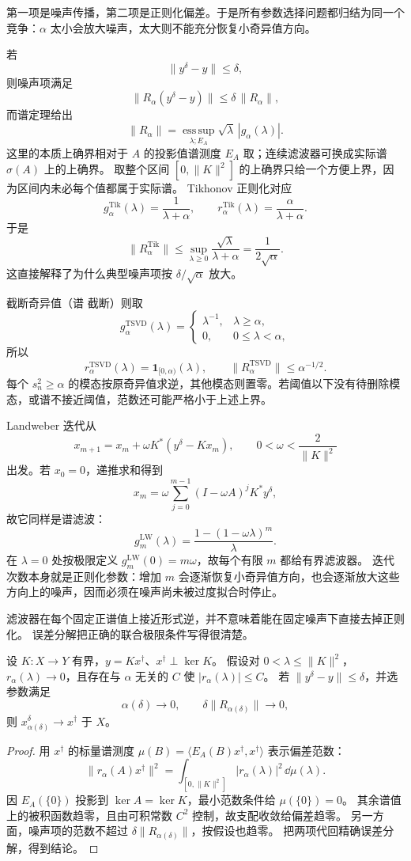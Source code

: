 第一项是噪声传播，第二项是正则化偏差。于是所有参数选择问题都归结为同一个竞争：$\alpha$ 太小会放大噪声，太大则不能充分恢复小奇异值方向。

若
\[
\|y^\delta-y\|\le\delta,
\]
则噪声项满足
\[
\|R_\alpha(y^\delta-y)\|
\le
\delta\,\|R_\alpha\|,
\]
而谱定理给出
\[
{
\|R_\alpha\|
=
\operatorname*{ess\,sup}_{\lambda;E_A}
\sqrt\lambda\,|g_\alpha(\lambda)|
}.
\]
这里的本质上确界相对于 $A$ 的投影值谱测度 $E_A$ 取；连续滤波器可换成实际谱 $\sigma(A)$ 上的上确界。
取整个区间 $[0,\|K\|^2]$ 的上确界只给一个方便上界，因为区间内未必每个值都属于实际谱。
Tikhonov 正则化对应
\[
g_\alpha^{\mathrm{Tik}}(\lambda)
=\frac{1}{\lambda+\alpha},
\qquad
r_\alpha^{\mathrm{Tik}}(\lambda)
=\frac{\alpha}{\lambda+\alpha}.
\]
于是
\[
\|R_\alpha^{\mathrm{Tik}}\|
\le\sup_{\lambda\ge0}\frac{\sqrt\lambda}{\lambda+\alpha}
=\frac{1}{2\sqrt\alpha}.
\]
这直接解释了为什么典型噪声项按 $\delta/\sqrt\alpha$ 放大。

截断奇异值（谱 截断）则取
\[
g_\alpha^{\mathrm{TSVD}}(\lambda)
=\begin{cases}
\lambda^{-1},&\lambda\ge\alpha,\\
0,&0\le\lambda<\alpha,
\end{cases}
\]
所以
\[
r_\alpha^{\mathrm{TSVD}}(\lambda)
=\mathbf 1_{[0,\alpha)}(\lambda),
\qquad
\|R_\alpha^{\mathrm{TSVD}}\|\le\alpha^{-1/2}.
\]
每个 $s_n^2\ge\alpha$ 的模态按原奇异值求逆，其他模态则置零。若阈值以下没有待删除模态，或谱不接近阈值，范数还可能严格小于上述上界。

Landweber 迭代从
\[
x_{m+1}=x_m+\omega K^*(y^\delta-Kx_m),
\qquad
0<\omega<\frac{2}{\|K\|^2}
\]
出发。若 $x_0=0$，递推求和得到
\[
x_m
=\omega\sum_{j=0}^{m-1}(I-\omega A)^jK^*y^\delta,
\]
故它同样是谱滤波：
\[
{
g_m^{\mathrm{LW}}(\lambda)
=\frac{1-(1-\omega\lambda)^m}{\lambda}}.
\]
在 $\lambda=0$ 处按极限定义 $g_m^{\mathrm{LW}}(0)=m\omega$，故每个有限 $m$ 都给有界滤波器。
迭代次数本身就是正则化参数：增加 $m$ 会逐渐恢复小奇异值方向，也会逐渐放大这些方向上的噪声，因而必须在噪声尚未被过度拟合时停止。

滤波器在每个固定正谱值上接近形式逆，并不意味着能在固定噪声下直接去掉正则化。
误差分解把正确的联合极限条件写得很清楚。

\begin{theorem}[谱滤波恢复最小范数解的条件]
设 $K:X\to Y$ 有界，$y=Kx^\dagger$、$x^\dagger\perp\ker K$。
假设对 $0<\lambda\le\|K\|^2$，$r_\alpha(\lambda)\to0$，且存在与 $\alpha$ 无关的 $C$ 使 $|r_\alpha(\lambda)|\le C$。
若 $\|y^\delta-y\|\le\delta$，并选参数满足
\[
\alpha(\delta)\longrightarrow0,\qquad
\delta\|R_{\alpha(\delta)}\|\longrightarrow0,
\]
则 $x_{\alpha(\delta)}^\delta\to x^\dagger$ 于 $X$。
\end{theorem}
\begin{proof}
用 $x^\dagger$ 的标量谱测度 $\mu(B)=\langle E_A(B)x^\dagger,x^\dagger\rangle$ 表示偏差范数：
\[
\|r_\alpha(A)x^\dagger\|^2
=\int_{[0,\|K\|^2]}|r_\alpha(\lambda)|^2\,\dd\mu(\lambda).
\]
因 $E_A(\{0\})$ 投影到 $\ker A=\ker K$，最小范数条件给 $\mu(\{0\})=0$。
其余谱值上的被积函数趋零，且由可积常数 $C^2$ 控制，故支配收敛给偏差趋零。
另一方面，噪声项的范数不超过 $\delta\|R_{\alpha(\delta)}\|$，按假设也趋零。
把两项代回精确误差分解，得到结论。
\end{proof}

